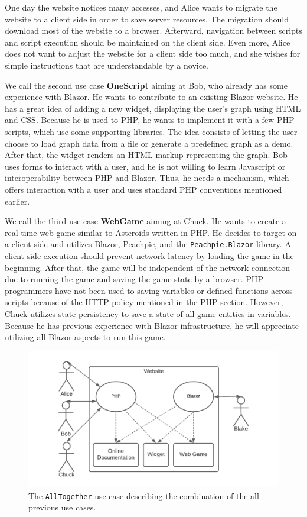 One day the website notices many accesses, and Alice wants to migrate the website to a client side in order to save server resources.
The migration should download most of the website to a browser.
Afterward, navigation between scripts and script execution should be maintained on the client side.
Even more, Alice does not want to adjust the website for a client side too much, and she wishes for simple instructions that are understandable by a novice.
\par
We call the second use case \textbf{OneScript} aiming at Bob, who already has some experience with Blazor.
He wants to contribute to an existing Blazor website.
He has a great idea of adding a new widget, displaying the user's graph using HTML and CSS.
Because he is used to PHP, he wants to implement it with a few PHP scripts, which use some supporting libraries.
The idea consists of letting the user choose to load graph data from a file or generate a predefined graph as a demo.
After that, the widget renders an HTML markup representing the graph.
Bob uses forms to interact with a user, and he is not willing to learn Javascript or interoperability between PHP and Blazor.
Thus, he needs a mechanism, which offers interaction with a user and uses standard PHP conventions mentioned earlier.
\par
We call the third use case \textbf{WebGame} aiming at Chuck.
He wants to create a real-time web game similar to Asteroids written in PHP.
He decides to target on a client side and utilizes Blazor, Peachpie, and the \texttt{Peachpie.Blazor} library.
A client side execution should prevent network latency by loading the game in the beginning.
After that, the game will be independent of the network connection due to running the game and saving the game state by a browser.
PHP programmers have not been used to saving variables or defined functions across scripts because of the HTTP policy mentioned in the PHP section.
However, Chuck utilizes state persistency to save a state of all game entities in variables.
Because he has previous experience with Blazor infrastructure, he will appreciate utilizing all Blazor aspects to run this game.
\par
\begin{figure}
\centering
\includegraphics[scale=0.8]{./img/UseCaseAllTogether}
\caption{The \texttt{AllTogether} use case describing the combination of the all previous use cases. }
\label{img09:usecase}
\end{figure} 
